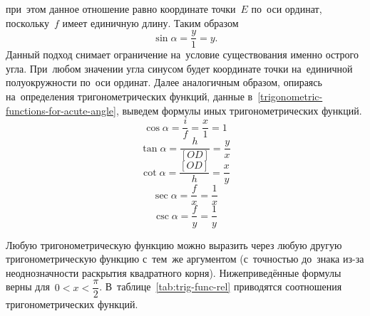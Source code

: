 \documentclass[]{scrartcl}
\begin{document}
при~этом данное отношение равно координате точки~${\textstyle E}$ по~оси ординат, поскольку~${\textstyle f}$ имеет единичную длину. Таким образом
\begin{equation}\label{eq:sinus-formula-2}
\sin \alpha = \frac{y}{1}=y.
\end{equation}
Данный подход снимает ограничение на~условие существования именно острого угла. При~любом значении угла синусом будет координате точки на~единичной полуокружности по~оси ординат. Далее аналогичным образом, опираясь на~определения тригонометрических функций, данные в~\ref{trigonometric-functions-for-acute-angle}, выведем формулы иных тригонометрических функций.
\begin{equation}\label{eq:cosinus-formula-1}
\cos \alpha = \frac{i}{f}=\frac{x}{1}=1
\end{equation}
\begin{equation}\label{eq:tangens-formula-1}
\tan \alpha = \frac{h}{[OD]}=\frac{y}{x}
\end{equation}
\begin{equation}\label{eq:cotangens-formula-1}
\cot \alpha = \frac{[OD]}{h}=\frac{x}{y}
\end{equation}
\begin{equation}\label{eq:secans-formula-1}
\sec \alpha = \frac{f}{x}=\frac{1}{x}
\end{equation}
\begin{equation}\label{eq:cosecans-formula-1}
\csc \alpha = \frac{f}{y}=\frac{1}{y}
\end{equation}

Любую тригонометрическую функцию можно выразить через любую другую тригонометрическую функцию с~тем~же аргументом (с~точностью до~знака из-за неоднозначности раскрытия квадратного корня). Нижеприведённые формулы верны для~$\textstyle 0 < x < \dfrac{\pi}{2}$. В~таблице~\ref{tab:trig-func-rel} приводятся соотношения тригонометрических функций.
\end{document}
